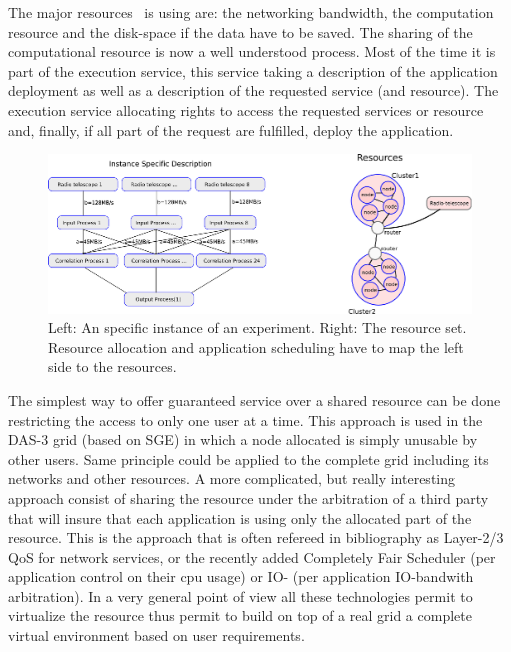 The major resources \scarie\ is using are: the networking bandwidth, 
the computation resource and the disk-space if the data have 
to be saved. The sharing of the computational resource is now
a well understood process. Most of the time it is part of the 
execution service, this service taking a description of the 
application deployment as well as a description of the 
requested service (and resource). The execution service 
allocating rights to access the requested services or 
resource and, finally, if all part of the request 
are fulfilled, deploy the application. 
\begin{figure}
  \centering
  \includegraphics[width=\textwidth]
    {img/mapping.eps}
    \caption{Left: An specific instance of an experiment. Right: The resource set. Resource 
allocation and application scheduling have to map the left side to the resources. }
  \label{fig:mapping}
\end{figure}
The simplest way to offer guaranteed service over a shared resource
can be done restricting the access to only one user at a time. This
approach is used in the DAS-3 grid (based on SGE) in which a node
allocated is simply unusable by other users. Same principle could be
applied to the complete grid including its networks and other
resources. A more complicated, but really interesting approach consist
of sharing the resource under the arbitration of a third party that
will insure that each application is using only the allocated part of
the resource. This is the approach that is often refereed in
bibliography as Layer-2/3 QoS for network services, or the recently
added Completely Fair Scheduler (per application control on their cpu
usage) or IO- (per application IO-bandwith arbitration). In a very
general point of view all these technologies permit to virtualize the
resource thus permit to build on top of a real grid a complete virtual
environment based on user requirements.

